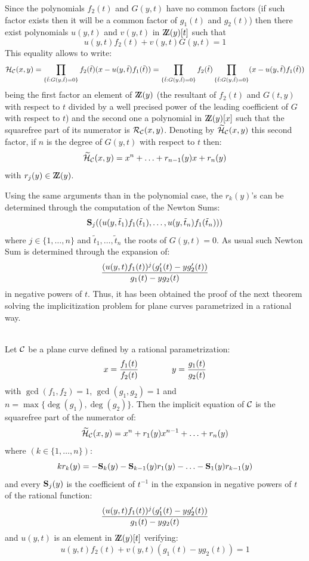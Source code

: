 Since the polynomials $f_2(t)$ and $G(y,t)$ have no common factors (if
such factor exists then it will be a common factor of $g_1(t)$ and $g_2(t)$)
then there exist polynomials $u(y,t)$ and $v(y,t)$ in $\Z(y)[t]$ such
that
\[u(y,t)f_2(t)+v(y,t)G(y,t)=1\] This equality allows to write:
\[{\cal H}_{\cal C}(x,y)=
\prod_{\{\tilde{t}:G(y,\tilde{t})=0\}}
f_2(\tilde{t})(x-u(y,\tilde{t})f_1(\tilde{t}))=
\prod_{\{\tilde{t}:G(y,\tilde{t})=0\}}f_2(\tilde{t})
\prod_{\{\tilde{t}:G(y,\tilde{t})=0\}}
(x-u(y,\tilde{t})f_1(\tilde{t}))
\] being the first factor an element of $\Z(y)$ (the resultant of
$f_2(t)$ and
$G(t,y)$ with respect to $t$ divided by a well precised power of the
leading coefficient of $G$ with respect to $t$) and the second one a
polynomial in
$\Z(y)[x]$ such that the squarefree part of its numerator is ${\cal
R}_{\cal C}(x,y)$. Denoting by $\widetilde{\cal H}_{\cal C}(x,y)$
this second factor, if
$n$ is the degree of $G(y,t)$ with respect to $t$ then:
\[\widetilde{\cal H}_{\cal C}(x,y)= x^n+\ldots+r_{n-1}(y)x+r_n(y)\] 
with $r_j(y)\in\Z(y)$.

Using the same arguments than in the polynomial case, the $r_k(y)$'s
can be determined through the computation of the Newton Sums:
\[{\bf S}_j( (u(y,\tilde{t}_1)f_1(\tilde{t}_1),\ldots,
u(y,\tilde{t}_n)f_1(\tilde{t}_n)))\] where $j\in\{1,\ldots,n\}$ and
$\tilde{t}_1,\ldots,\tilde{t}_n$ the roots of
$G(y,t)=0$. As usual such Newton Sum is determined through the
expansion of:
\[{{(u(y,t)f_1(t))^j(g_1'(t)-yg_2'(t))}\over{g_1(t)-yg_2(t)}}\] in
negative powers of $t$. Thus, it has been obtained the proof of the
next theorem solving the implicitization problem for plane curves
parametrized in a rational way.

\begin{teorema} \hskip 0pt\\ Let ${\cal C}$ be a plane curve defined
by a rational parametrization:
\[x={{f_1(t)}\over{f_2(t)}}\qquad\qquad y={{g_1(t)}\over{g_2(t)}}\]
with $\gcd(f_1,f_2)=1$, $\gcd(g_1,g_2)=1$ and 
$n=\max\{\deg(g_1),\deg(g_2)\}$. Then the implicit equation of
${\cal C}$ is the squarefree part of the numerator of:
\[\widetilde{\cal H}_{\cal C}(x,y)=x^n+r_1(y)x^{n-1}+\ldots+r_n(y)\]
where 
$(k\in\{1,\ldots,n\})$:
\[kr_k(y)=
-{\bf S}_k(y)-{\bf S}_{k-1}(y)r_1(y)-\ldots-{\bf
S}_1(y)r_{k-1}(y)\] and every ${\bf S}_j(y)$ is the coefficient
of $t^{-1}$ in the expansion in negative powers of $t$ of the
rational function:
\[{{(u(y,t)f_1(t))^j(g_1'(t)-yg_2'(t))}\over{g_1(t)-yg_2(t)}}\] and
$u(y,t)$ is an element in $\Z(y)[t]$ verifying:
\[u(y,t)f_2(t)+v(y,t)(g_1(t)-yg_2(t))=1\]
\end{teorema}

